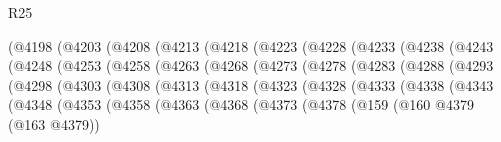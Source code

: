 \begin{lexlean}{R25}
\begin{coremodule}
                (@4198
                  (@4203
                    (@4208
                      (@4213
                        (@4218
                          (@4223
                            (@4228
                              (@4233
                                (@4238
                                  (@4243
                                    (@4248
                                      (@4253
                                        (@4258
                                          (@4263
                                            (@4268
                                              (@4273
                                                (@4278
                                                  (@4283
                                                    (@4288
                                                      (@4293
                                                        (@4298
                                                          (@4303
                                                            (@4308
                                                              (@4313
                                                                (@4318
                                                                  (@4323
                                                                    (@4328
                                                                      (@4333
                                                                        (@4338
                                                                          (@4343
                                                                            (@4348
                                                                              (@4353
                                                                                (@4358
                                                                                  (@4363
                                                                                    (@4368
                                                                                      (@4373
                                                                                        (@4378
                                                                                          (@159
                                                                                            (@160
                                                                                              @4379
                                                                                              (@163
                                                                                                @4379))

\end{coremodule}
\end{lexlean}
